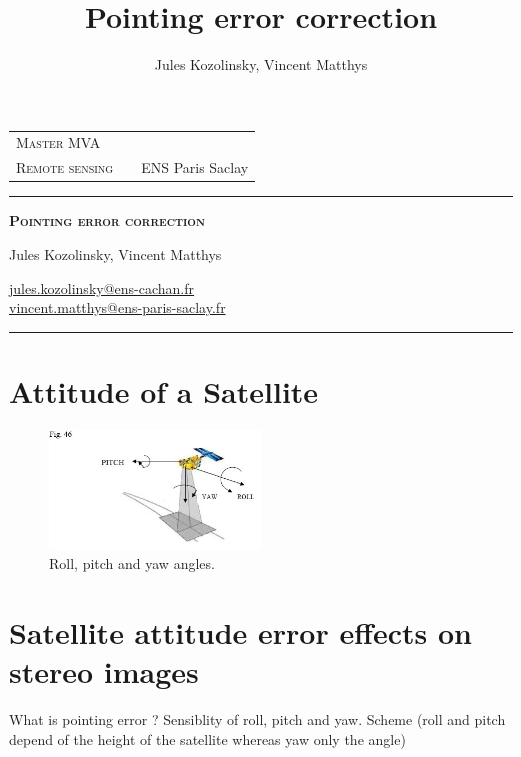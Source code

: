 \documentclass[paper=a4, fontsize=11pt, onecolumn, tikz, dvipsnames, svgnames, x11names]{article}
\title{\normalfont \normalsize \huge Pointing error correction}
\author{Jules Kozolinsky, Vincent Matthys}
\date{}
\begin{document}

 \begin{tabularx}{0.9\textwidth}{@{} l X r @{} }
 	{\textsc{Master MVA}}  &  & \textsc{} \\
 	\textsc{Remote sensing} &  & {ENS Paris Saclay}       \\
 \end{tabularx}
 \vspace{1.5cm}
 \begin{center}

 	\rule[11pt]{5cm}{0.5pt}

 	\textbf{\LARGE \textsc{Pointing error correction}}
 	\vspace{0.5cm}

 	Jules Kozolinsky,
 	Vincent Matthys

 	\href{mailto:jules.kozolinsky@ens-cachan.fr}{jules.kozolinsky@ens-cachan.fr} \\
 	\href{mailto:vincent.matthys@ens-paris-saclay.fr}{vincent.matthys@ens-paris-saclay.fr}

 	\rule{5cm}{0.5pt}

 	\vspace{1.5cm}
 \end{center}
 
 \tableofcontents

\section{Attitude of a Satellite}

\begin{figure}[h]
    \centering
    \includegraphics[width=0.5\textwidth]{figures/angles.jpg}
   \caption{ Roll, pitch and yaw angles.}
   \label{angles}
\end{figure}

\section{Satellite attitude error effects on stereo images}
\label{sec:sensibility}
What is pointing error ? 
Sensiblity of roll, pitch and yaw. Scheme (roll and pitch depend of the height of the satellite whereas yaw only the angle) 
\end{document}
